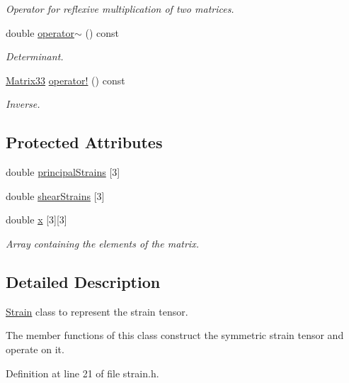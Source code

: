 \begin{DoxyCompactItemize}
\begin{DoxyCompactList}\small\item\em \-Operator for reflexive multiplication of two matrices. \end{DoxyCompactList}\item 
double \hyperlink{classMatrix33_a15b37caa6ab0d9f4a9f0d95846abd675}{operator$\sim$} () const 
\begin{DoxyCompactList}\small\item\em \-Determinant. \end{DoxyCompactList}\item 
\hyperlink{classMatrix33}{\-Matrix33} \hyperlink{classMatrix33_a1b822a20343a26b3c9bb7fd5c1247f37}{operator!} () const 
\begin{DoxyCompactList}\small\item\em \-Inverse. \end{DoxyCompactList}\end{DoxyCompactItemize}
\subsection*{\-Protected \-Attributes}
\begin{DoxyCompactItemize}
\item 
double \hyperlink{classStrain_a172c6ef4593e35bc9280a2dafde61475}{principal\-Strains} \mbox{[}3\mbox{]}
\item 
double \hyperlink{classStrain_afbc4d1b573860bda614a43f767b8b272}{shear\-Strains} \mbox{[}3\mbox{]}
\item 
double \hyperlink{classMatrix33_af7f01fa466616eb7c8eda2e4d9f85cdd}{x} \mbox{[}3\mbox{]}\mbox{[}3\mbox{]}
\begin{DoxyCompactList}\small\item\em \-Array containing the elements of the matrix. \end{DoxyCompactList}\end{DoxyCompactItemize}


\subsection{\-Detailed \-Description}
\hyperlink{classStrain}{\-Strain} class to represent the strain tensor. 

\-The member functions of this class construct the symmetric strain tensor and operate on it. 

\-Definition at line 21 of file strain.\-h.



